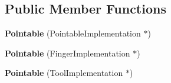 \subsection*{Public Member Functions}
\begin{DoxyCompactItemize}
\item 
\hypertarget{class_leap_1_1_pointable_a508745ae2e3402b4f754028197575457}{{\bfseries Pointable} (Pointable\+Implementation $\ast$)}\label{class_leap_1_1_pointable_a508745ae2e3402b4f754028197575457}

\item 
\hypertarget{class_leap_1_1_pointable_a20653c8953646cef96d78684f7e2c349}{{\bfseries Pointable} (Finger\+Implementation $\ast$)}\label{class_leap_1_1_pointable_a20653c8953646cef96d78684f7e2c349}

\item 
\hypertarget{class_leap_1_1_pointable_afa744fc2a9d312958a06d0d0a93f6799}{{\bfseries Pointable} (Tool\+Implementation $\ast$)}\label{class_leap_1_1_pointable_afa744fc2a9d312958a06d0d0a93f6799}


\end{DoxyCompactItemize}
